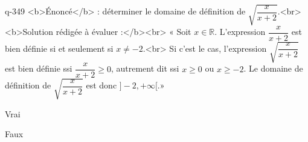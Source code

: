 \begin{truefalse}{q-349}
<b>Énoncé</b> : déterminer le domaine de définition de $\sqrt{\dfrac{x}{x+2}}$.<br> <b>Solution rédigée à évaluer :</b><br>  « Soit $x\in\mathbb{R}$. L'expression $\dfrac{x}{x+2}$ est bien définie si et seulement si $x\neq -2$.<br> Si c'est le cas, l'expression $\sqrt{\dfrac{x}{x+2}}$ est bien définie ssi $\dfrac{x}{x+2}\geq 0$, autrement dit ssi $x\geq 0$ ou $x\geq -2$. Le domaine de définition de $\sqrt{\dfrac{x}{x+2}}$ est donc $]-2,+\infty[$.»
\item Vrai
\item* Faux
\end{truefalse}

